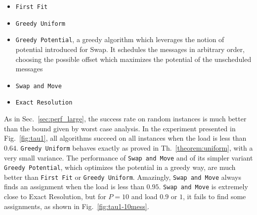 \documentclass[a4paper,cleveref, autoref, thm-restate,UKenglish]{lipics-v2019}
\newcommand\firstfit{\texttt{First Fit}\xspace}
\newcommand\greedyuniform{\texttt{Greedy Uniform}\xspace}
\newcommand\swapandmove{\texttt{Swap and Move}\xspace}
\newcommand\greedypotential{\texttt{Greedy Potential}\xspace}
\begin{document}
\begin{itemize}
  \item \firstfit
  \item \greedyuniform 
  \item \greedypotential, a greedy algorithm which leverages the notion of potential introduced for Swap. 
  It schedules the messages in arbitrary order, choosing the possible offset which maximizes the potential of the unscheduled messages
  \item \swapandmove 
  \item \texttt{Exact Resolution}
\end{itemize}

As in Sec.~\ref{sec:perf_large}, the success rate on random instances is much better than the bound given by worst case analysis. In the experiment presented in Fig.~\ref{fig:tau1}, all algorithms succeed on all instances when the load is less than $0.64$. \greedyuniform behaves exactly as proved in Th.~\ref{theorem:uniform}, with a very small variance. The performance of \swapandmove and of its simpler variant \greedypotential, which optimizes the potential in a greedy way, are much better than \firstfit or \greedyuniform. Amazingly, \swapandmove always finds an assignment when the load is less than $0.95$. \swapandmove is extremely close to Exact Resolution, but for $P=10$ and load $0.9$ or $1$, it fails to find some assignments, as shown in Fig.~\ref{fig:tau1-10mess}.
\end{document}
